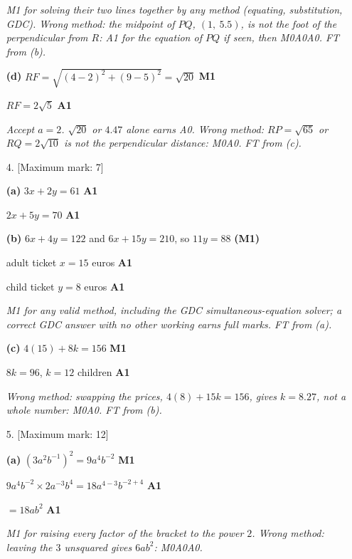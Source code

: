 \documentclass[12pt, twoside]{article}
\begin{document}
\begin{enumerate}[itemsep=0.3cm]
\emph{M1 for solving their two lines together by any method (equating,
substitution, GDC). Wrong method: the midpoint of $PQ$, $(1,\ 5.5)$, is
not the foot of the perpendicular from $R$: A1 for the equation of $PQ$ if
seen, then M0A0A0. FT from (b).}

\textbf{(d)} $RF = \sqrt{(4 - 2)^{2} + (9 - 5)^{2}} = \sqrt{20}$ \hfill \textbf{M1}

$RF = 2\sqrt{5}$ \hfill \textbf{A1}

\emph{Accept $a = 2$. $\sqrt{20}$ or $4.47$ alone earns A0. Wrong method:
$RP = \sqrt{65}$ or $RQ = 2\sqrt{10}$ is not the perpendicular distance:
M0A0. FT from (c).}

\newpage

\item[4.] [Maximum mark: 7]

\textbf{(a)} $3x + 2y = 61$ \hfill \textbf{A1}

$2x + 5y = 70$ \hfill \textbf{A1}

\textbf{(b)} $6x + 4y = 122$ and $6x + 15y = 210$, so $11y = 88$ \hfill \textbf{(M1)}

adult ticket $x = 15$ euros \hfill \textbf{A1}

child ticket $y = 8$ euros \hfill \textbf{A1}

\emph{M1 for any valid method, including the GDC simultaneous-equation
solver; a correct GDC answer with no other working earns full marks. FT
from (a).}

\textbf{(c)} $4(15) + 8k = 156$ \hfill \textbf{M1}

$8k = 96$, \quad $k = 12$ children \hfill \textbf{A1}

\emph{Wrong method: swapping the prices, $4(8) + 15k = 156$, gives
$k = 8.27$, not a whole number: M0A0. FT from (b).}

\newpage

\item[5.] [Maximum mark: 12]

\textbf{(a)} $\left(3a^{2}b^{-1}\right)^{2} = 9a^{4}b^{-2}$ \hfill \textbf{M1}

$9a^{4}b^{-2} \times 2a^{-3}b^{4} = 18a^{4 - 3}b^{-2 + 4}$ \hfill \textbf{A1}

$= 18ab^{2}$ \hfill \textbf{A1}

\emph{M1 for raising every factor of the bracket to the power $2$. Wrong
method: leaving the $3$ unsquared gives $6ab^{2}$: M0A0A0.}


\end{enumerate}
\end{document}
